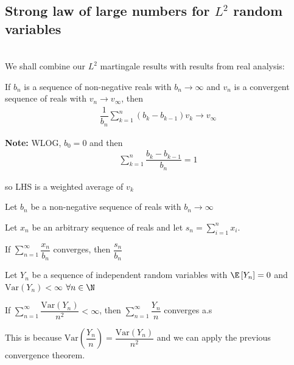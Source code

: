 \subsection{Strong law of large numbers for $L^2$ random variables}\hfill\\
\noindent We shall combine our $L^2$ martingale results with results from real analysis:
\par\bigskip
\begin{lem}{}
  If $b_n$ is a sequence of non-negative reals with $b_n\to\infty$ and $v_n$ is a convergent sequence of reals with $v_n\to v_\infty$, then 
  \begin{equation*}
    \begin{gathered}
      \dfrac{1}{b_n}\sum_{k=1}^{n}(b_k-b_{k-1})v_k\to v_\infty
    \end{gathered}
  \end{equation*}
  \par\bigskip
  \noindent\textbf{Note:} WLOG, $b_0=0$ and then 
  \begin{equation*}
    \begin{gathered}
      \sum_{k=1}^{n}\dfrac{b_k-b_{k-1}}{b_n} = 1
    \end{gathered}
  \end{equation*}\par
  \noindent so LHS is a weighted average of $v_k$
\end{lem}
\par\bigskip
\begin{lem}{}
  Let $b_n $ be a non-negative sequence of reals with $b_n\to\infty$\par
  \noindent Let $x_n$ be an arbitrary sequence of reals and let $s_n = \sum_{i=1}^{n}x_i$.
  \par\bigskip
  \noindent If $\sum_{n=1}^{\infty}\dfrac{x_n}{b_n}$ converges, then $\dfrac{s_n}{b_n}$
\end{lem}
\par\bigskip
\noindent Let $Y_n$ be a sequence of independent random variables with $\E\left[Y_n\right] = 0$ and $\text{Var}\left(Y_n\right) <\infty$ $\forall n\in\N$
\par\bigskip
\noindent If $\sum_{n=1}^{\infty}\dfrac{\text{Var}\left(Y_n\right)}{n^2}<\infty$, then $\sum_{n=1}^{\infty}\dfrac{Y_n}{n}$ converges a.s\par
\noindent This is because $\text{Var}\left(\dfrac{Y_n}{n}\right) = \dfrac{\text{Var}\left(Y_n\right)}{n^2}$ and we can apply the previous convergence theorem.
\par\bigskip
